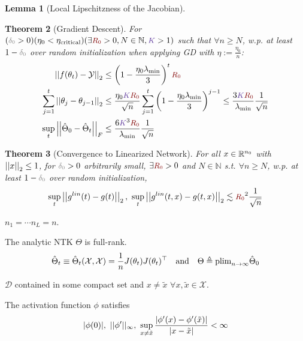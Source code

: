 \documentclass{article}
\newtheorem{theorem}{Theorem}[section]
\newtheorem{lemma}[theorem]{Lemma}
\newcommand\mc{\mathcal}
\begin{document}
\begin{appendices}
\begin{lemma}[Local Lipschitzness of the Jacobian]
\end{lemma}

\begin{theorem}[Gradient Descent]\label{thm:lee-g.1}
	For $(\d > 0)( \eta_0 < \eta_{\text{critical}}) (\exists \r > 0, N \in \mathbb{N}, \k > 1)$ such that $\forall n \geq N$, w.p. at least $1 - \d$ over random initialization when applying GD with $\eta := \frac{\eta_0}{n}$:
	\begin{align}
		\norm{f(\theta_t) - \mc Y} 
			&\leq \lr{1 - \frac{\eta_0 \lambda_{\text{min}}}{3}}^t \r  \label{eq:S49-1} \\
		\sum_{j = 1}^{t} \norm{\theta_j -  \theta_{j - 1}} 
			&\leq \frac{\eta_0 \k \r}{\sqrt{n}} \sum_{j=1}^t \lr{1 -   \frac{\eta_0 \lambda_{\text{min}}}{3} }^{j-1} 
				\leq \frac{ 3 \k \r }{\lambda_{\text{min}}} \inv{\sqrt n}
				\label{eq:S49-2} \\
		\sup_t \norm[F]{\hat\Theta_0 - \hat\Theta_t} 
			&\leq \frac{6 \k^3 \r}{\lambda_{\text{min}}} \inv{\sqrt n} \label{eq:S50}
	\end{align}
\end{theorem}

\begin{theorem}[Convergence to Linearized Network]\label{thm:lee-h.1}
	For all $x \in \mathbb{R}^{n_0}$ with $\left|\left| x \right|\right|_{2} \leq 1$, for $\d > 0$ arbitrarily small, $\exists \r > 0$ and $N \in \mathbb{N}$ s.t. $\forall n \geq N$, w.p. at least $1 - \d$ over random initialization,
	\begin{align}
		\sup_t \norm{g^{lin}(t) - g(t)}, ~ \sup_t \norm{g^{lin}(t, x) - g(t, x)} \lesssim \r^2 \inv{\sqrt n}
	\end{align}
\end{theorem}

\begin{compactenum}
	\item $n_1 = \cdots n_L = n$. 
	\item The analytic NTK $\Theta$ is full-rank. 
	\begin{align}
		\hat\Theta_t \equiv \hat\Theta_t(\mc X, \mc X) = \inv{n} J(\theta_t) J(\theta_t)^\top 
		\quad 
		\text{and}
		\quad 
		\Theta \triangleq \text{plim}_{n \to \infty} \hat\Theta_0
		\label{eq:S42}
	\end{align}
	\item $\mc D$ contained in some compact set and $x \neq \tilde x$ $\forall x, \tilde x \in \mc X$. 
	\item The activation function $\phi$ satisfies 
	\begin{align}
		|\phi(0)|, ~
		||\phi'||_{\infty}, ~
		\sup_{x \neq \tilde x} \frac{\left|  \phi'(x) - \phi'(\tilde x) \right|}{|x - \tilde x|} < \infty 
	\end{align}


\end{compactenum}
\end{appendices}
\end{document}
